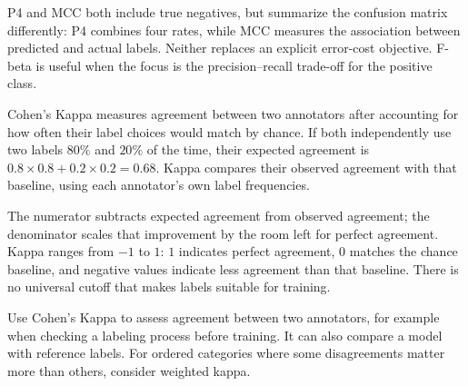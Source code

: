 \metricsecondary

P4 and MCC both include true negatives, but summarize the confusion matrix differently: P4 combines four rates, while MCC measures the association between predicted and actual labels. Neither replaces an explicit error-cost objective. F-beta is useful when the focus is the precision--recall trade-off for the positive class.

\metricend
\clearpage
\thispagestyle{classificationstyle}
\label{sec:cohen-s-kappa}

Cohen's Kappa measures agreement between two annotators after accounting for how often their label choices would match by chance. If both independently use two labels $80\%$ and $20\%$ of the time, their expected agreement is $0.8\times0.8+0.2\times0.2=0.68$. Kappa compares their observed agreement with that baseline, using each annotator's own label frequencies.

\begin{metricformula}
\end{metricformula}

The numerator subtracts expected agreement from observed agreement; the denominator scales that improvement by the room left for perfect agreement. Kappa ranges from $-1$ to $1$: $1$ indicates perfect agreement, $0$ matches the chance baseline, and negative values indicate less agreement than that baseline. There is no universal cutoff that makes labels suitable for training.


Use Cohen's Kappa to assess agreement between two annotators, for example when checking a labeling process before training. It can also compare a model with reference labels. For ordered categories where some disagreements matter more than others, consider weighted kappa.


